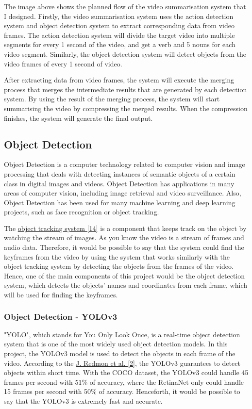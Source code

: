 \documentclass{article}
\begin{document}
The image above shows the planned flow of the video summarisation system that I designed. Firstly, the video summarisation system uses the action detection system and object detection system to extract corresponding data from video frames. The action detection system will divide the target video into multiple segments for every 1 second of the video, and get a verb and 5 nouns for each video segment. Similarly, the object detection system will detect objects from the video frames of every 1 second of video.

After extracting data from video frames, the system will execute the merging process that merges the intermediate results that are generated by each detection system. By using the result of the merging process, the system will start summarising the video by compressing the merged results. When the compression finishes, the system will generate the final output.

\subsection{Object Detection}

Object Detection is a computer technology related to computer vision and image processing that deals with detecting instances of semantic objects of a certain class in digital images and videos. Object Detection has applications in many areas of computer vision, including image retrieval and video surveillance. Also, Object Detection has been used for many machine learning and deep learning projects, such as face recognition or object tracking.

The \hyperlink{ref14}{object tracking system [14]} is a component that keeps track on the object by watching the stream of images. As you know the video is a stream of frames and audio data. Therefore, it would be possible to say that the system could find the keyframes from the video by using the system that works similarly with the object tracking system by detecting the objects from the frames of the video. Hence, one of the main components of this project would be the object detection system, which detects the objects' names and coordinates from each frame, which will be used for finding the keyframes.

\subsubsection{Object Detection - YOLOv3}

"YOLO", which stands for You Only Look Once, is a real-time object detection system that is one of the most widely used object detection models. In this project, the YOLOv3 model is used to detect the objects in each frame of the video. According to the \hyperlink{ref2}{J. Redmon et al. [2]}, the YOLOv3 guarantees to detect objects within short time. With the COCO dataset, the YOLOv3 could handle 45 frames per second with 51\% of accuracy, where the RetinaNet only could handle 15 frames per second with 50\% of accuracy. Henceforth, it would be possible to say that the YOLOv3 is extremely fast and accurate.
\end{document}
